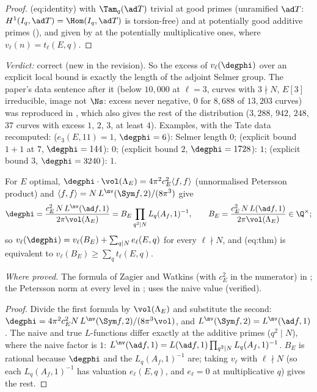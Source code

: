 \begin{sloppypar}
\begin{proof}
(eq:identity) with $\Tam_q(\ad T)$ trivial at good primes (unramified $\ad T$: $H^1(I_q,\ad T)=\Hom(I_q,\ad T)$ is torsion-free) and at potentially good additive primes
(), and given by  at the potentially multiplicative ones, where $v_\ell(n)=t_\ell(E,q)$.
\end{proof}

\noindent\emph{Verdict:} correct (new in the revision). So the excess of $v_\ell(\degphi)$ over an explicit local bound is exactly the length of the adjoint Selmer group. The
paper's data sentence after it (below $10{,}000$ at $\ell=3$, curves with $3\nmid N$, $E[3]$ irreducible, image not $\Ns$: excess never negative, $0$ for $8{,}688$ of $13{,}203$ curves) was
reproduced in , which also gives the rest of the distribution ($3{,}288$, $942$, $248$, $37$ curves with excess $1$, $2$, $3$, at least $4$). Examples, with the
Tate data recomputed:  ($e_3(E,11)=1$, $\degphi=6$): Selmer length $0$;  (explicit bound $1+1$ at $7$, $\degphi=144$): $0$;  (explicit bound $2$,
$\degphi=1728$): $1$;  (explicit bound $3$, $\degphi=3240$): $1$.

\begin{proposition}\label{prop:paper:degree}
For $E$ optimal, $\degphi\cdot\vol(\Lambda_E)=4\pi^2c_E^2\langle f,f\rangle$ (unnormalised Petersson product) and $\langle f,f\rangle=N\,L^{\nv}(\Sym f,2)/(8\pi^3)$ give
\[
\degphi=\frac{c_E^2\,N\,L^{\nv}(\ad f,1)}{2\pi\vol(\Lambda_E)}=B_E\prod_{q^2\mid N}L_q(A_f,1)^{-1},\qquad B_E=\frac{c_E^2\,N\,L(\ad f,1)}{2\pi\vol(\Lambda_E)}\in\Q^\times;
\]
so $v_\ell(\degphi)=v_\ell(B_E)+\sum_{q\mid N}e_\ell(E,q)$ for every $\ell\nmid N$, and (eq:thm) is equivalent to $v_\ell(B_E)\ge\sum_qt_\ell(E,q)$.
\end{proposition}

\noindent\emph{Where proved.} The formula of Zagier and Watkins (with $c_E^2$ in the numerator) in ; the Petersson norm at every level in ;
\cite[Lemma 2.12]{DFG04} uses the naive value (verified).

\begin{proof}
Divide the first formula by $\vol(\Lambda_E)$ and substitute the second: $\degphi=4\pi^2c_E^2N\,L^{\nv}(\Sym f,2)/(8\pi^3\vol)$, and $L^{\nv}(\Sym f,2)=L^{\nv}(\ad f,1)$. The naive and true $L$-functions
differ exactly at the additive primes ($q^2\mid N$), where the naive factor is $1$: $L^{\nv}(\ad f,1)=L(\ad f,1)\prod_{q^2\mid N}L_q(A_f,1)^{-1}$. $B_E$ is rational because $\degphi$ and the $L_q(A_f,1)^{-1}$
are; taking $v_\ell$ with $\ell\nmid N$ (so each $L_q(A_f,1)^{-1}$ has valuation $e_\ell(E,q)$, and $e_\ell=0$ at multiplicative $q$) gives the rest.
\end{proof}


\end{sloppypar}
